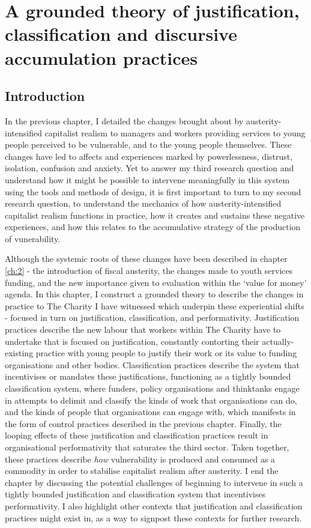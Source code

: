 \chapter{A grounded theory of justification, classification and discursive accumulation practices}
\label{ch:6}

\section{Introduction}
\label{sec:6-1-intro}
In the previous chapter, I detailed the changes brought about by austerity-intensified capitalist realism to managers and workers providing services to young people perceived to be vulnerable, and to the young people themselves. These changes have led to affects and experiences marked by powerlessness, distrust, isolation, confusion and anxiety. Yet to answer my third research question and understand how it might be possible to intervene meaningfully in this system using the tools and methods of design, it is first important to turn to my second research question, to understand the mechanics of how austerity-intensified capitalist realism functions in practice, how it creates and sustains these negative experiences, and how this relates to the accumulative strategy of the production of vunerability.

Although the systemic roots of these changes have been described in chapter \ref{ch:2} - the introduction of fiscal austerity, the changes made to youth services funding, and the new importance given to evaluation within the ‘value for money’ agenda. In this chapter, I construct a grounded theory to describe the changes in practice to The Charity I have witnessed which underpin these experiential shifts - focused in turn on justification, classification, and performativity. Justification practices describe the new labour that workers within The Charity have to undertake that is focused on justification, constantly contorting their actually-existing practice with young people to justify their work or its value to funding organisations and other bodies. Classification practices describe the system that incentivises or mandates these justifications, functioning as a tightly bounded classification system, where funders, policy organisations and thinktanks engage in attempts to delimit and classify the kinds of work that organisations can do, and the kinds of people that organisations can engage with, which manifests in the form of control practices described in the previous chapter. Finally, the looping effects of these justification and classification practices result in organisational performativity that saturates the third sector. Taken together, these practices describe \emph{how} vulnerability is produced and consumed as a commodity in order to stabilise capitalist realism after austerity.  I end the chapter by discussing the potential challenges of beginning to intervene in such a tightly bounded justification and classification system that incentivises performativity. I also highlight other contexts that justification and classification practices might exist in, as a way to signpost these contexts for further research. 

